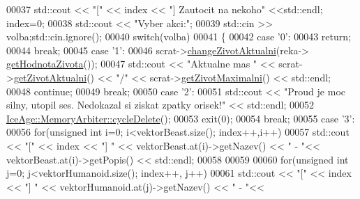 \begin{DoxyCode}
00037             std::cout << \textcolor{stringliteral}{"["} << index << \textcolor{stringliteral}{"] Zautocit na nekoho"} <<std::endl; index=0;
00038             std::cout << \textcolor{stringliteral}{"Vyber akci:"};
00039             std::cin >> volba;std::cin.ignore();
00040             \textcolor{keywordflow}{switch}(volba)
00041             \{
00042                 \textcolor{keywordflow}{case} \textcolor{charliteral}{'0'}:
00043                     \textcolor{keywordflow}{return};
00044                     \textcolor{keywordflow}{break};
00045                 \textcolor{keywordflow}{case} \textcolor{charliteral}{'1'}:
00046                     scrat->\hyperlink{classIceAge_1_1Zivot_a980dc5a5af6d14c23ecca025e3ec7485}{changeZivotAktualni}(reka->
      \hyperlink{classIceAge_1_1Reka_acc4d9a4ef69da03eed8762e16a33b49f}{getHodnotaZivota}());
00047                     std::cout << \textcolor{stringliteral}{"Aktualne mas "} << scrat->\hyperlink{classIceAge_1_1Zivot_ae4e3a167722a80ccace3985f183ddd8d}{getZivotAktualni}() << \textcolor{stringliteral}{"/"} << 
      scrat->\hyperlink{classIceAge_1_1Zivot_a75a65879dd6ddc0bc3e402ac6f613813}{getZivotMaximalni}() << std::endl;
00048                     \textcolor{keywordflow}{continue};
00049                     \textcolor{keywordflow}{break};
00050                 \textcolor{keywordflow}{case} \textcolor{charliteral}{'2'}:
00051                     std::cout << \textcolor{stringliteral}{"Proud je moc silny, utopil ses. Nedokazal si ziskat zpatky orisek!"} << 
      std::endl;
00052                     \hyperlink{classIceAge_1_1MemoryArbiter_ae3460492678cf992629f4a70de3ef1ca}{IceAge::MemoryArbiter::cycleDelete}();
00053                     exit(0);
00054                     \textcolor{keywordflow}{break};
00055                 \textcolor{keywordflow}{case} \textcolor{charliteral}{'3'}:
00056                     \textcolor{keywordflow}{for}(\textcolor{keywordtype}{unsigned} \textcolor{keywordtype}{int} i=0; i<vektorBeast.size(); index++,i++)
00057                          std::cout << \textcolor{stringliteral}{"["} << index << \textcolor{stringliteral}{"] "} << vektorBeast.at(i)->getNazev() << \textcolor{stringliteral}{" - "}<< 
      vektorBeast.at(i)->getPopis() << std::endl;
00058 
00059 
00060                     \textcolor{keywordflow}{for}(\textcolor{keywordtype}{unsigned} \textcolor{keywordtype}{int} j=0; j<vektorHumanoid.size(); index++, j++)
00061                         std::cout << \textcolor{stringliteral}{"["} << index << \textcolor{stringliteral}{"] "} << vektorHumanoid.at(j)->getNazev() << \textcolor{stringliteral}{" - "}<< 

\end{DoxyCode}
